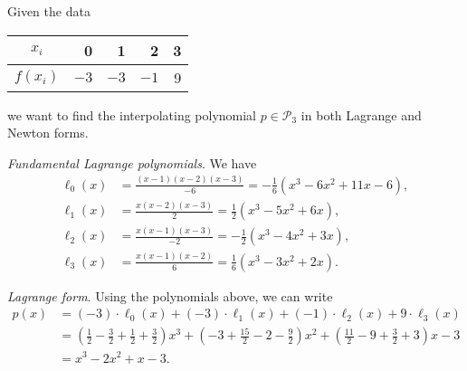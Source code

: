\documentclass[a4paper]{scrartcl}
\begin{document}
\begin{example}
  Given the data
  \begin{center}
    \begin{tabular}{c|r|r|r|r}
      $x_{i}$ & 0 & 1 & 2 & 3 \\
      \hline$f\left(x_{i}\right)$ & $-3$ & $-3$ & $-1$ & 9
      \end{tabular}
  \end{center}
  we want to find the interpolating polynomial $p \in \mathcal{P}_3$ in both Lagrange and Newton forms.

  \emph{Fundamental Lagrange polynomials}. We have 
  \begin{align*}
      \ell_{0}(x)&=\frac{(x-1)(x-2)(x-3)}{-6}=-\frac{1}{6}\left(x^{3}-6 x^{2}+11 x-6\right), \\
      \ell_{1}(x)&=\frac{x(x-2)(x-3)}{2}=\frac{1}{2}\left(x^{3}-5 x^{2}+6 x\right), \\
      \ell_{2}(x)&=\frac{x(x-1)(x-3)}{-2}=-\frac{1}{2}\left(x^{3}-4 x^{2}+3 x\right), \\
      \ell_{3}(x)&=\frac{x(x-1)(x-2)}{6}=\frac{1}{6}\left(x^{3}-3 x^{2}+2 x\right) .
  \end{align*}

  \emph{Lagrange form}. Using the polynomials above, we can write
  \begin{align*}
      p(x) &=(-3) \cdot \ell_{0}(x)+(-3) \cdot \ell_{1}(x)+(-1) \cdot \ell_{2}(x)+9 \cdot \ell_{3}(x) \\
      &=\left(\frac{1}{2}-\frac{3}{2}+\frac{1}{2}+\frac{3}{2}\right) x^{3}+\left(-3+\frac{15}{2}-2-\frac{9}{2}\right) x^{2}+\left(\frac{11}{2}-9+\frac{3}{2}+3\right) x-3 \\
      &=x^{3}-2 x^{2}+x-3 .
  \end{align*}
\end{example}
\end{document}
